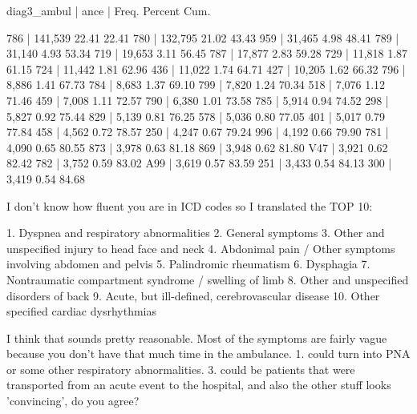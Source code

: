 \documentclass{article}
\begin{document}
\begin{enumerate}
\begin{markdown}
	diag3_ambul |
           ance |      Freq.     Percent        Cum.

            786 |    141,539       22.41       22.41
            780 |    132,795       21.02       43.43
       		959 |     31,465        4.98       48.41
        	789 |     31,140        4.93       53.34
        	719 |     19,653        3.11       56.45
        	787 |     17,877        2.83       59.28
	        729 |     11,818        1.87       61.15
	        724 |     11,442        1.81       62.96
	        436 |     11,022        1.74       64.71
	        427 |     10,205        1.62       66.32
	        796 |      8,886        1.41       67.73
	        784 |      8,683        1.37       69.10
	        799 |      7,820        1.24       70.34
	        518 |      7,076        1.12       71.46
	        459 |      7,008        1.11       72.57
	        790 |      6,380        1.01       73.58
	        785 |      5,914        0.94       74.52
	        298 |      5,827        0.92       75.44
	        829 |      5,139        0.81       76.25
	        578 |      5,036        0.80       77.05
	        401 |      5,017        0.79       77.84
	        458 |      4,562        0.72       78.57
	        250 |      4,247        0.67       79.24
	        996 |      4,192        0.66       79.90
	        781 |      4,090        0.65       80.55
	        873 |      3,978        0.63       81.18
	        869 |      3,948        0.62       81.80
	        V47 |      3,921        0.62       82.42
	        782 |      3,752        0.59       83.02
	        A99 |      3,619        0.57       83.59
	        251 |      3,433        0.54       84.13
	        300 |      3,419        0.54       84.68
\end{markdown}
\begin{markdown}

I don't know how fluent you are in ICD codes so I translated the TOP 10:

	1. Dyspnea and respiratory abnormalities
	2. General symptoms
	3. Other and unspecified injury to head face and neck
	4. Abdonimal pain / Other symptoms involving abdomen and pelvis
	5. Palindromic rheumatism 
	6. Dysphagia
	7. Nontraumatic compartment syndrome / swelling of limb
	8. Other and unspecified disorders of back
	9. Acute, but ill-defined, cerebrovascular disease
	10. Other specified cardiac dysrhythmias

I think that sounds pretty reasonable. Most of the symptoms are fairly vague because you don't have that much time in the ambulance. 1. could turn into PNA or some other respiratory abnormalities. 3. could be patients that were transported from an acute event to the hospital, and also the other stuff looks 'convincing', do you agree?


\end{markdown}
\end{enumerate}
\end{document}

